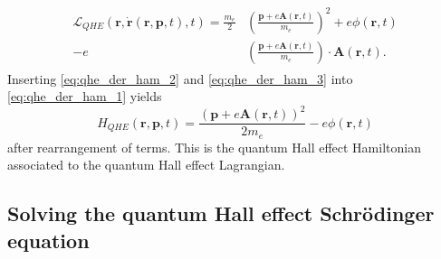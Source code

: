 \documentclass{report}
\numberwithin{tm}{section}
\newcommand\vect[1]{\ensuremath{\bm{#1}}}
\begin{document}
\begin{align}
\begin{aligned}
\mathcal{L}_{QHE}(\vect{r},\dot{\vect{r}}(\vect{r},\vect{p},t),t) = \frac{m_e}{2}&\left(\frac{\vect{p}+e\vect{A}(\vect{r},t)}{m_e}\right)^2 + e\phi(\vect{r},t) \\  -e&\left(\frac{\vect{p}+e\vect{A}(\vect{r},t)}{m_e}\right)\cdot\vect{A}(\vect{r},t).
\end{aligned}\end{align} Inserting \cref{eq:qhe_der_ham_2} and \cref{eq:qhe_der_ham_3} into \cref{eq:qhe_der_ham_1} yields \begin{equation}\label{eq:quantumhallhamiltonian}
H_{QHE}(\vect{r},\vect{p},t) = \frac{(\vect{p}+e\vect{A}(\vect{r},t))^2}{2m_e} - e\phi(\vect{r},t)
\end{equation} after rearrangement of terms. This is the quantum Hall effect Hamiltonian associated to the quantum Hall effect Lagrangian.
	
\subsection{Solving the quantum Hall effect Schrödinger equation}
\end{document}
